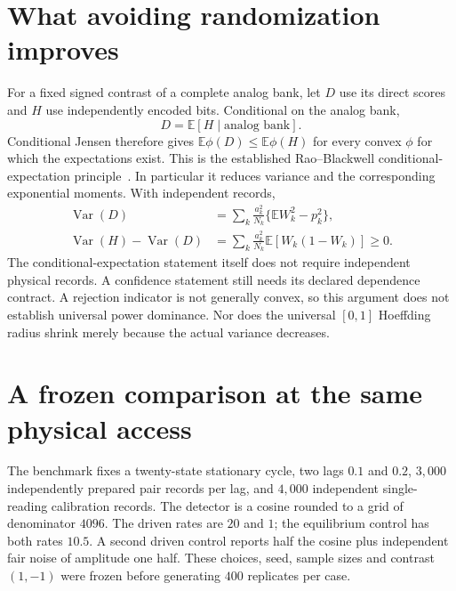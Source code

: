 \section{What avoiding randomization improves}
For a fixed signed contrast of a complete analog bank, let $D$ use its direct
scores and $H$ use independently encoded bits. Conditional on the analog bank,
\[
 D=\mathbb E[H\mid\text{analog bank}].
\]
Conditional Jensen therefore gives $\mathbb E\phi(D)\leq\mathbb E\phi(H)$ for
every convex $\phi$ for which the expectations exist. This is the established
Rao--Blackwell conditional-expectation principle~\cite{ciBlackwell1947}. In particular it reduces
variance and the corresponding exponential moments. With independent records,
\begin{align}
 \operatorname{Var}(D)&=\sum_k\frac{a_k^2}{N_k}
       \{\mathbb E W_k^2-p_k^2\},\\
 \operatorname{Var}(H)-\operatorname{Var}(D)
 &=\sum_k\frac{a_k^2}{N_k}\mathbb E[W_k(1-W_k)]\geq0.
 \label{eq:ci-analog-variance}
\end{align}
The conditional-expectation statement itself does not require independent
physical records. A confidence statement still needs its declared dependence
contract. A rejection indicator is not generally convex, so this argument does
not establish universal power dominance. Nor does the universal $[0,1]$
Hoeffding radius shrink merely because the actual variance decreases.

\section{A frozen comparison at the same physical access}
The benchmark fixes a twenty-state stationary cycle, two lags $0.1$ and $0.2$,
$3{,}000$ independently prepared pair records per lag, and $4{,}000$ independent
single-reading calibration records. The detector is a cosine rounded to a grid
of denominator $4096$. The driven rates are $20$ and $1$; the equilibrium
control has both rates $10.5$. A second driven control reports half the cosine
plus independent fair noise of amplitude one half. These choices, seed, sample
sizes and contrast $(1,-1)$ were frozen before generating $400$ replicates per
case.

